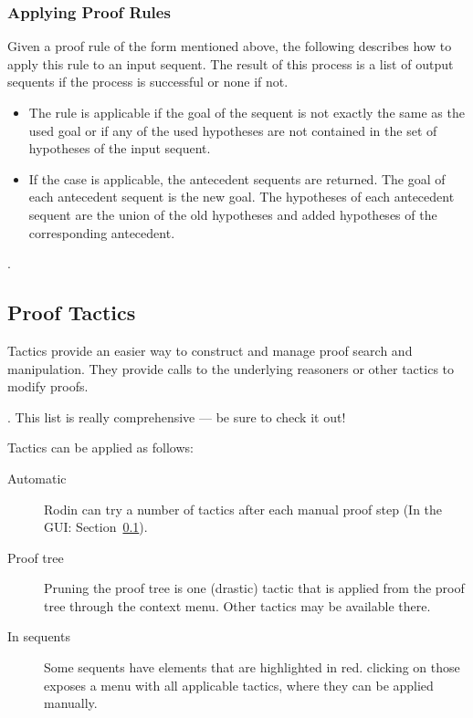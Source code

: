 \subsubsection{Applying Proof Rules}

Given a proof rule of the form mentioned above, the following describes how to apply this rule to an input sequent. The result of this process is a list of output sequents if the process is successful or none if not.

\begin{itemize}
	\item The rule is applicable if the goal of the sequent is not exactly the same as the used goal or if any of the used hypotheses are not contained in the set of hypotheses of the input sequent. 
	\item If the case is applicable, the antecedent sequents are returned. The goal of each antecedent sequent is the new goal. The hypotheses of each antecedent sequent are the union of the old hypotheses and added hypotheses of the corresponding antecedent. 
\end{itemize}

.

\subsection{Proof Tactics}

Tactics provide an easier way to construct and manage proof search and manipulation. They provide calls to the underlying reasoners or other tactics to modify proofs.

.  This list is really comprehensive --- be sure to check it out!

Tactics can be applied as follows:

\begin{description}
	\item[Automatic] Rodin can try a number of tactics after each manual proof step (In the GUI: Section~\ref{}).
	\item[Proof tree] Pruning the proof tree is one (drastic) tactic that is applied from the proof tree through the context menu.  Other tactics may be available there.
	\item[In sequents] Some sequents have elements that are highlighted in red.  clicking on those exposes a menu with all applicable tactics, where they can be applied manually.
\end{description}

